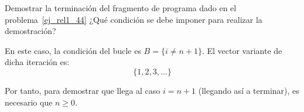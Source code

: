 \begin{ejercicio}
\end{ejercicio}

\begin{ejercicio}
    Demostrar la terminación del fragmento de programa dado en el problema~\ref{ej_rel1_44} ¿Qué condición se debe imponer para realizar la demostración?
    
    En este caso, la condición del bucle es $B=\{i\neq n+1\}$. El vector variante de dicha iteración es:
    \begin{equation*}
        \{1,2,3,\ldots\}
    \end{equation*}

    Por tanto, para demostrar que llega al caso $i=n+1$ (llegando así a terminar), es necesario que $n\geq 0$.
\end{ejercicio}
